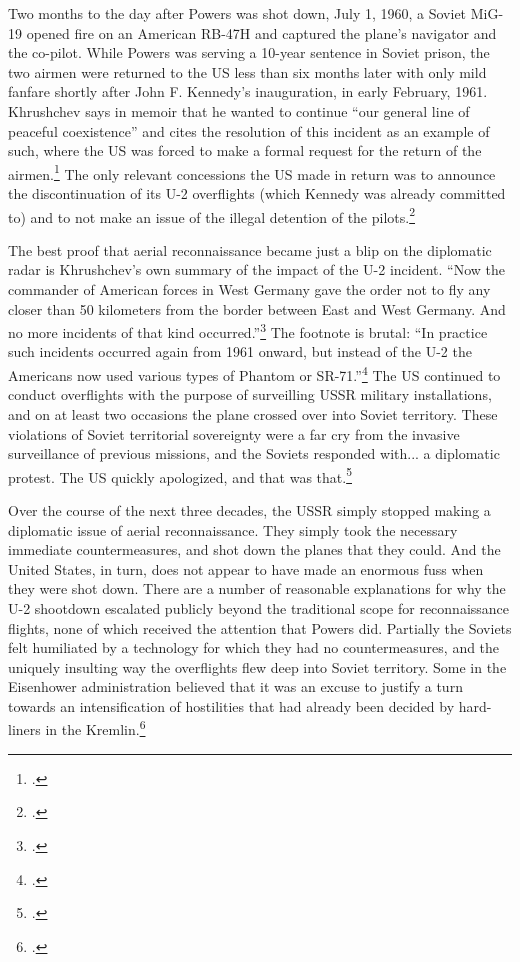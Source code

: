 \documentclass{report}
\begin{document}
\begin{refsegment}
Two months to the day after Powers was shot down, July 1, 1960, a Soviet MiG-19 opened fire on an American RB-47H and captured the plane's navigator and the co-pilot. While Powers was serving a 10-year sentence in Soviet prison, the two airmen were returned to the US less than six months later with only mild fanfare shortly after John F. Kennedy's inauguration, in early February, 1961. Khrushchev says in memoir that he wanted to continue ``our general line of peaceful coexistence'' and cites the resolution of this incident as an example of such, where the US was forced to make a formal request for the return of the airmen.\footcite[p.~256-257]{khrushchev_memoirs_2007} The only relevant concessions the US made in return was to announce the discontinuation of its U-2 overflights (which Kennedy was already committed to) and to not make an issue of the illegal detention of the pilots.\footcite{time_cold_1961}

The best proof that aerial reconnaissance became just a blip on the diplomatic radar is Khrushchev's own summary of the impact of the U-2 incident. ``Now the commander of American forces in West Germany gave the order not to fly any closer than 50 kilometers from the border between East and West Germany. And no more incidents of that kind occurred.''\footcite[p.~256]{khrushchev_memoirs_2007} The footnote is brutal: ``In practice such incidents occurred again from 1961 onward, but instead of the U-2 the Americans now used various types of Phantom or SR-71.''\footcite[p.~258]{khrushchev_memoirs_2007} The US continued to conduct overflights with the purpose of surveilling USSR military installations, and on at least two occasions the plane crossed over into Soviet territory. These violations of Soviet territorial sovereignty were a far cry from the invasive surveillance of previous missions, and the Soviets responded with... a diplomatic protest. The US quickly apologized, and that was that.\footcite{orlov_u-2_2007}

Over the course of the next three decades, the USSR simply stopped making a diplomatic issue of aerial reconnaissance. They simply took the necessary immediate countermeasures, and shot down the planes that they could. And the United States, in turn, does not appear to have made an enormous fuss when they were shot down. There are a number of reasonable explanations for why the U-2 shootdown escalated publicly beyond the traditional scope for reconnaissance flights, none of which received the attention that Powers did. Partially the Soviets felt humiliated by a technology for which they had no countermeasures, and the uniquely insulting way the overflights flew deep into Soviet territory. Some in the Eisenhower administration believed that it was an excuse to justify a turn towards an intensification of hostilities that had already been decided by hard-liners in the Kremlin.\footcite[p.~328]{kistiakowsky_scientist_1976}


\end{refsegment}
\end{document}
